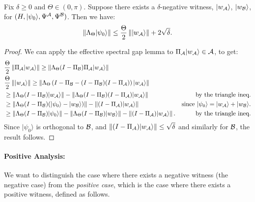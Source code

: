 \documentclass{theoretics}
\def\ket#1{{\lvert}#1\rangle}
\renewcommand{\>}{\rangle}
\newcommand{\<}{\langle}
\renewcommand{\(}{\left(}
\renewcommand{\)}{\right)}
\def\norm#1{\left\| #1 \right\|}
\begin{document}
\begin{lemma}\label{lem:lin-alg-negative-approx}
Fix $\delta\geq 0$ and $\Theta\in (0,\pi)$. Suppose there exists a $\delta$-negative witness, $\ket{w_{\cal A}}$, $\ket{w_{\cal B}}$, for $(H,\ket{\psi_0},\Psi^{\cal A},\Psi^{\cal B})$. Then we have:
\begin{equation*}
\norm{\Lambda_\Theta\ket{\psi_0}} \leq \frac{\Theta}{2}\norm{\ket{w_{\cal A}}}+2\sqrt{\delta}.
\end{equation*}
\end{lemma}
\begin{proof}
We can apply the effective spectral gap lemma to $\Pi_{\cal A}\ket{w_{\cal A}}\in {\cal A}$, to get:
\begin{align*}
&\frac{\Theta}{2}\norm{\Pi_{\cal A}\ket{w_{\cal A}}} \geq \norm{\Lambda_\Theta(I-\Pi_{\cal B})\Pi_{\cal A}\ket{w_{\cal A}}} \\
&\frac{\Theta}{2}\norm{\ket{w_{\cal A}}} \geq \norm{\Lambda_\Theta\left( I-\Pi_{\cal B} -(I-\Pi_{\cal B})(I-\Pi_{\cal A}) \right)\ket{w_{\cal A}}}\\
&\geq \norm{\Lambda_\Theta( I-\Pi_{\cal B})\ket{w_{\cal A}}} - \norm{\Lambda_\Theta(I-\Pi_{\cal B})(I-\Pi_{\cal A}) \ket{w_{\cal A}}} & \mbox{by the triangle ineq.}\\
&\geq \norm{\Lambda_\Theta( I-\Pi_{\cal B})(\ket{\psi_0}-\ket{w_{\cal B}})} - \norm{(I-\Pi_{\cal A}) \ket{w_{\cal A}}} & \mbox{since }\ket{\psi_0}=\ket{w_{\cal A}}+\ket{w_{\cal B}}.\\
&\geq \norm{\Lambda_\Theta(I-\Pi_{\cal B})\ket{\psi_0}} - \norm{\Lambda_\Theta(I-\Pi_{\cal B})\ket{w_{\cal B}}} - \norm{(I-\Pi_{\cal A}) \ket{w_{\cal A}}}. & \mbox{by the triangle ineq.}
\end{align*}
Since $\ket{\psi_0}$ is orthogonal to ${\cal B}$, and $\norm{(I-\Pi_{\cal A})\ket{w_{\cal A}}}\leq \sqrt{\delta}$ and similarly for ${\cal B}$, the result follows. \end{proof}




\paragraph{Positive Analysis:} 
We want to distinguish the case where there exists a negative witness (the negative case) from the \emph{positive case}, which is the case where there exists a positive witness, defined as follows.
\end{document}

